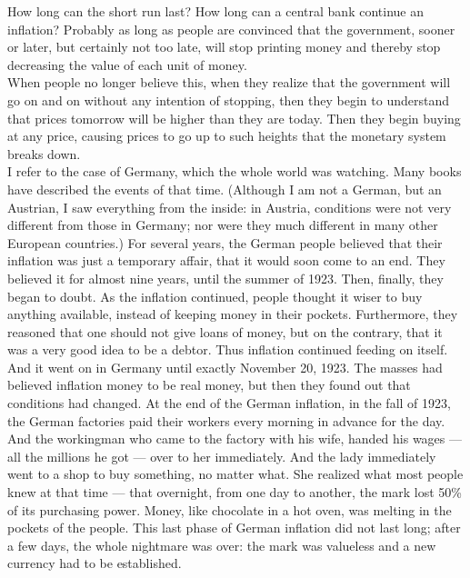 \documentclass[a4paper]{article}
\begin{document}
How long can the short run last? How long can a central bank continue an 
inflation? Probably as long as people are convinced that the government, sooner
or later, but certainly not too late, will stop printing money and thereby stop
decreasing the value of each unit of money.\\

When people no longer believe this, when they realize that the government will 
go on and on without any intention of stopping, then they begin to understand 
that prices tomorrow will be higher than they are today. Then they begin buying
at any price, causing prices to go up to such heights that the monetary system 
breaks down.\\

I refer to the case of Germany, which the whole world was watching. Many books 
have described the events of that time. (Although I am not a German, but an 
Austrian, I saw everything from the inside: in Austria, conditions were not 
very different from those in Germany; nor were they much different in many 
other European countries.) For several years, the German people believed that 
their inflation was just a temporary affair, that it would soon come to an end.
They believed it for almost nine years, until the summer of 1923. Then, 
finally, they began to doubt. As the inflation continued, people thought it 
wiser to buy anything available, instead of keeping money in their pockets. 
Furthermore, they reasoned that one should not give loans of money, but on the 
contrary, that it was a very good idea to be a debtor. Thus inflation continued
feeding on itself.\\

And it went on in Germany until exactly November 20, 1923. The masses had 
believed inflation money to be real money, but then they found out that 
conditions had changed. At the end of the German inflation, in the fall of 
1923, the German factories paid their workers every morning in advance for the 
day. And the workingman who came to the factory with his wife, handed his wages
— all the millions he got — over to her immediately. And the lady immediately 
went to a shop to buy something, no matter what. She realized what most people 
knew at that time — that overnight, from one day to another, the mark lost 50\% 
of its purchasing power. Money, like chocolate in a hot oven, was melting in 
the pockets of the people. This last phase of German inflation did not last 
long; after a few days, the whole nightmare was over: the mark was valueless 
and a new currency had to be established.\\
\end{document}
